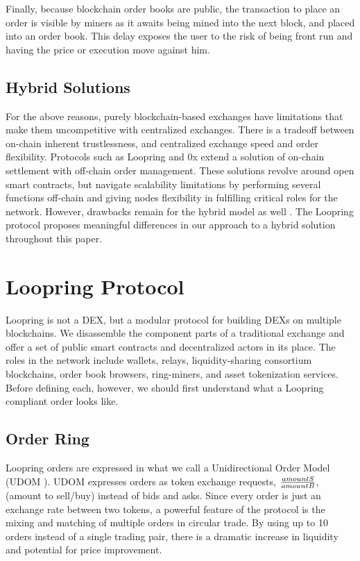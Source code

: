 \documentclass[UTF8,nofonts]{article}
\begin{document}
\begin{multicols}{2}
Finally, because blockchain order books are public, the transaction to place an order is visible by miners as it awaits being mined into the next block, and placed into an order book. This delay exposes the user to the risk of being front run and having the price or execution move against him.

\subsection{Hybrid Solutions}
For the above reasons, purely blockchain-based exchanges have limitations that make them uncompetitive with centralized exchanges. There is a tradeoff between on-chain inherent trustlessness, and centralized exchange speed and order flexibility. Protocols such as Loopring and 0x \cite{warren20170x} extend a solution of on-chain settlement with off-chain order management. These solutions revolve around open smart contracts, but navigate scalability limitations by performing several functions off-chain and giving nodes flexibility in fulfilling critical roles for the network. However, drawbacks remain for the hybrid model as well \cite{costofdecent}. The Loopring protocol proposes meaningful differences in our approach to a hybrid solution throughout this paper.


\section{Loopring Protocol\label{sec:loopring_protocol}}
Loopring is not a DEX, but a modular protocol for building DEXs on multiple blockchains. We disassemble the component parts of a traditional exchange and offer a set of public smart contracts and decentralized actors in its place. The roles in the network include wallets, relays, liquidity-sharing consortium blockchains, order book browsers, ring-miners, and asset tokenization services. Before defining each, however, we should first understand what a Loopring compliant order looks like. 

\subsection{Order Ring\label{sec:order_ring}}
Loopring orders are expressed in what we call a Unidirectional Order Model (UDOM \cite{coinport2014udom}). UDOM expresses orders as token exchange requests, $amountS \over amountB$, (amount to sell/buy)  instead of bids and asks. Since every order is just an exchange rate between two tokens, a powerful feature of the protocol is the mixing and matching of multiple orders in circular trade. By using up to 10 orders instead of a single trading pair, there is a dramatic increase in liquidity and potential for price improvement. 


\end{multicols}
\end{document}
